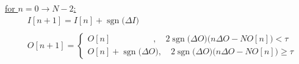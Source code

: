 \documentclass{article}
\DeclareMathOperator{\sgn}{sgn}
\begin{document}
\underline{for $n = 0 \rightarrow N - 2$:}
\begin{align*}
    &I[n + 1] = I[n] + \sgn\big(\Delta I\big) \\ \\ 
    &O[n + 1] = \begin{cases}
                    O[n] \quad \quad \quad \quad \quad, \quad 2\sgn\big(\Delta O\big)\Bigg(n\Delta O - NO[n] \Bigg) < \tau \\
                    O[n] + \sgn\big(\Delta O\big), \quad 2\sgn\big(\Delta O\big)\Bigg(n\Delta O - NO[n] \Bigg) \geq \tau
                  \end{cases} \\ \\ 
\end{align*}
\end{document}

